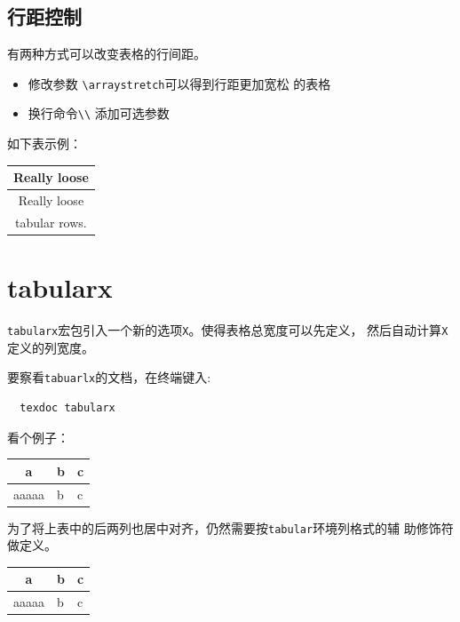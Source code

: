 \documentclass{article}
\begin{document}
\subsection{行距控制}

有两种方式可以改变表格的行间距。
\begin{itemize}
\item 修改参数 \verb!\arraystretch!可以得到行距更加宽松
的表格
\item 换行命令\verb!\\! 添加可选参数
\end{itemize}

如下表示例：
  
\renewcommand\arraystretch{1.8}
\begin{table}[H]
  \centering
  \begin{tabular}{|c|}
    \hline
    Really loose \\  \hline
    Really loose \\ [6pt] \hline
    tabular rows.\\ \hline
  \end{tabular}
\end{table}
\renewcommand\arraystretch{1}
\section{tabularx}

\texttt{tabularx}宏包引入一个新的选项\texttt{X}。使得表格总宽度可以先定义，
然后自动计算\verb!X!定义的列宽度。

要察看\texttt{tabuarlx}的文档，在终端键入:
\begin{verbatim}
  texdoc tabularx
\end{verbatim}

看个例子：

\begin{table}[h!]
  \centering
  \begin{tabularx}{0.8\textwidth}{|c|*{2}{X|}}
    \hline
    a &  b & c \\
    \hline
    aaaaa &  b & c  \\
    \hline
  \end{tabularx}
\end{table}

为了将上表中的后两列也居中对齐，仍然需要按\texttt{tabular}环境列格式的辅
助修饰符做定义。

\begin{table}[h!]
  \centering
  \begin{tabularx}{0.8\textwidth}{|c|>{\centering\arraybackslash}X|X|}
    \hline
    a &  b & c \\
    \hline
    aaaaa &  b & c  \\
    \hline
  \end{tabularx}
\end{table}
\end{document}
